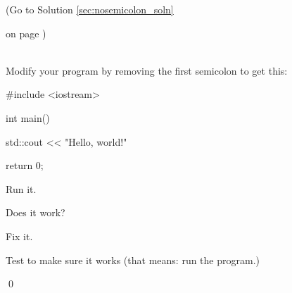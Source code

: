 \label{sec:nosemicolon}

(Go to Solution \ref{sec:nosemicolon_soln} 

on page \pageref{sec:nosemicolon_soln}) 

\\

Modify your program by removing the first semicolon to get this:

\begin{console}

#include <iostream>



int main()

{

    std::cout << "Hello, world!\n"



    return 0;

}

\end{console}

Run it. 

Does it work? 

Fix it. 

Test to make sure it works (that means: run the program.)

\qed


